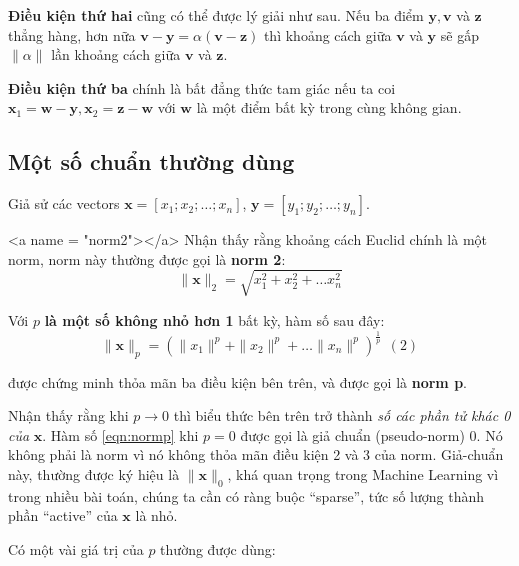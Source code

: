 \documentclass[12pt]{article}
\begin{document}
\textbf{Điều kiện thứ hai} cũng có thể được lý giải như sau. Nếu ba điểm $\mathbf{y, v}$ và $\mathbf{z}$ thẳng hàng, hơn nữa $\mathbf{v - y} = \alpha (\mathbf{v - z}) $ thì khoảng cách giữa $\mathbf{v}$ và $\mathbf{y}$ sẽ gấp $ \|\alpha \|$ lần khoảng cách giữa $\mathbf{v}$ và $\mathbf{z}$. 
 
\textbf{Điều kiện thứ ba} chính là bất đẳng thức tam giác nếu ta coi $\mathbf{x}_1 = \mathbf{ w - y}, \mathbf{x}_2 = \mathbf{z - w} $ với $\mathbf{w}$ là một điểm bất kỳ trong cùng không gian. 
 
 
 
\subsection{Một số chuẩn thường dùng}
 
Giả sử các vectors $\mathbf{x} = [x_1; x_2; \dots; x_n]$, $\mathbf{y} = [y_1; y_2; \dots; y_n]$. 
 
<a name = "norm2"></a> 
Nhận thấy rằng khoảng cách Euclid chính là một norm, norm này thường được gọi là \textbf{norm 2}: 
\begin{equation} 
	\label{eqn:norm2}
	\|\mathbf{x}\|_2 = \sqrt{x_1^2 + x_2^2 + \dots x_n^2} 
\end{equation}
 
Với $p$ \textbf{là một số không nhỏ hơn 1} bất kỳ, hàm số sau đây: 
\begin{equation} 
	\label{eqn:normp}
	\|\mathbf{x}\|_p = (\|x_1\|^p + \|x_2\|^p + \dots \|x_n\|^p)^{\frac{1}{p}} ~~(2) 
\end{equation} 
 
được chứng minh thỏa mãn ba điều kiện bên trên, và được gọi là \textbf{norm p}.  
 
 
Nhận thấy rằng khi $p \rightarrow 0 $ thì biểu thức bên trên trở thành \textit{số các phần tử khác 0 của} $\mathbf{x}$. Hàm số \eqref{eqn:normp} khi $p = 0$ được gọi là giả chuẩn (pseudo-norm) 0. Nó không phải là norm vì nó không thỏa mãn điều kiện 2 và 3 của norm. Giả-chuẩn này, thường được ký hiệu là $\|\mathbf{x}\|_0$, khá quan trọng trong Machine Learning vì trong nhiều bài toán, chúng ta cần có ràng buộc “sparse”, tức số lượng thành phần “active” của $\mathbf{x}$ là nhỏ.  
 
Có một vài giá trị của $p$ thường được dùng: 
\end{document}
